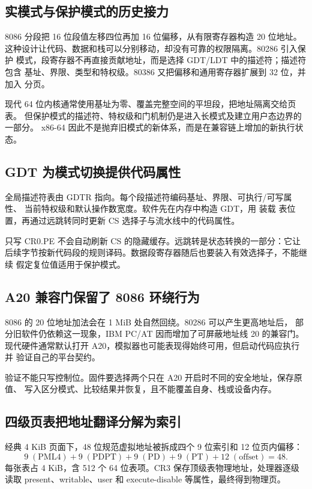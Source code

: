 \subsection{实模式与保护模式的历史接力}

8086 分段把 16 位段值左移四位再加 16 位偏移，从有限寄存器构造 20 位地址。
这种设计让代码、数据和栈可以分别移动，却没有可靠的权限隔离。80286 引入保护
模式，段寄存器不再直接贡献地址，而是选择 GDT/LDT 中的描述符；描述符包含
基址、界限、类型和特权级。80386 又把偏移和通用寄存器扩展到 32 位，并加入
分页。

现代 64 位内核通常使用基址为零、覆盖完整空间的平坦段，把地址隔离交给页表。
但保护模式的描述符、特权级和门机制仍是进入长模式及建立用户态边界的一部分。
x86-64 因此不是抛弃旧模式的新体系，而是在兼容链上增加的新执行状态。

\subsection{GDT 为模式切换提供代码属性}

全局描述符表由 GDTR 指向。每个段描述符编码基址、界限、可执行/可写属性、
当前特权级和默认操作数宽度。软件先在内存中构造 GDT，用  装载
表位置，再通过远跳转同时更新 CS 选择子与流水线中的代码属性。

只写 CR0.PE 不会自动刷新 CS 的隐藏缓存。远跳转是状态转换的一部分：它让
后续字节按新代码段的规则译码。数据段寄存器随后也要装入有效选择子，不能继续
假定复位值适用于保护模式。

\subsection{A20 兼容门保留了 8086 环绕行为}

8086 的 20 位地址加法会在 1 MiB 处自然回绕。80286 可以产生更高地址后，
部分旧软件仍依赖这一现象，IBM PC/AT 因而增加了可屏蔽地址线 20 的兼容门。
现代硬件通常默认打开 A20，模拟器也可能表现得始终可用，但启动代码应执行并
验证自己的平台契约。

验证不能只写控制位。固件要选择两个只在 A20 开启时不同的安全地址，保存原值、
写入区分模式、比较结果并恢复，且不能覆盖自身、栈或设备内存。

\subsection{四级页表把地址翻译分解为索引}

经典 4 KiB 页面下，48 位规范虚拟地址被拆成四个 9 位索引和 12 位页内偏移：
\[
  9\;(\mathrm{PML4})+9\;(\mathrm{PDPT})+9\;(\mathrm{PD})
  +9\;(\mathrm{PT})+12\;(\mathrm{offset})=48.
\]
每张表占 4 KiB，含 512 个 64 位表项。CR3 保存顶级表物理地址，处理器逐级
读取 present、writable、user 和 execute-disable 等属性，最终得到物理页。

